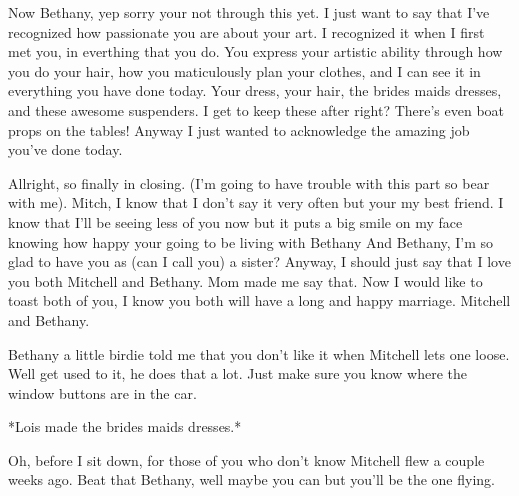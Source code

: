 \documentclass{letter}
\begin{document}
Now Bethany, yep sorry your not through this yet. I just want to say that I've recognized how passionate you are about your art. I recognized it when I first met you, in everthing that you do. You express your artistic ability through how you do your hair, how you maticulously plan your clothes, and I can see it in everything you have done today. Your dress, your hair, the brides maids dresses, and these awesome suspenders. I get to keep these after right? There's even boat props on the tables! Anyway I just wanted to acknowledge the amazing job you've done today.

Allright, so finally in closing. (I'm going to have trouble with this part so bear with me). Mitch, I know that I don't say it very often but your my best friend. I know that I'll be seeing less of you now but it puts a big smile on my face knowing how happy your going to be living with Bethany
And Bethany, I'm so glad to have you as (can I call you) a sister? Anyway, I should just say that I love you both Mitchell and Bethany. Mom made me say that. Now I would like to toast both of you, I know you both will have a long and happy marriage. Mitchell and Bethany.

Bethany a little birdie told me that you don't like it when Mitchell lets one loose. Well get used to it, he does that a lot. Just make sure you know where the window buttons are in the car. 

*Lois made the brides maids dresses.*

Oh, before I sit down, for those of you who don't know Mitchell flew a couple weeks ago. Beat that Bethany, well maybe you can but you'll be the one flying.
\end{document}
